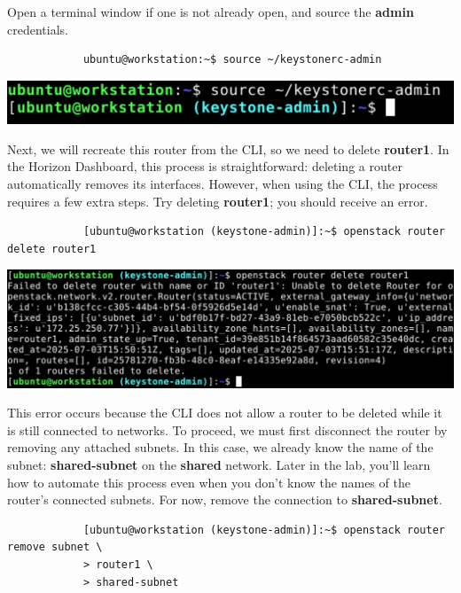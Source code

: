\documentclass[letterpaper, 12pt]{article}
\begin{document}
\begin{enumerate}
    \begin{labstep}
        Open a terminal window if one is not already open, and source the \textbf{admin} credentials.
        \begin{lstlisting}
            ubuntu@workstation:~$ source ~/keystonerc-admin
        \end{lstlisting}

        \begin{center}
            \includegraphics[width=\linewidth]{images/part2/step8.png}
        \end{center}
    \end{labstep}

    \begin{labstep}
        Next, we will recreate this router from the CLI, so we need to delete \textbf{router1}.
        In the Horizon Dashboard, this process is straightforward: deleting a router automatically removes its interfaces.
        However, when using the CLI, the process requires a few extra steps.
        Try deleting \textbf{router1}; you should receive an error.
        \begin{lstlisting}
            [ubuntu@workstation (keystone-admin)]:~$ openstack router delete router1
        \end{lstlisting}

        \begin{center}
            \includegraphics[width=\linewidth]{images/part2/step9.png}
        \end{center}
    \end{labstep}

    \begin{labstep}
        This error occurs because the CLI does not allow a router to be deleted while it is still connected to networks.
        To proceed, we must first disconnect the router by removing any attached subnets.
        In this case, we already know the name of the subnet: \textbf{shared-subnet} on the \textbf{shared} network.
        Later in the lab, you'll learn how to automate this process even when you don't know the names of the router's connected subnets.
        For now, remove the connection to \textbf{shared-subnet}.
        \begin{lstlisting}
            [ubuntu@workstation (keystone-admin)]:~$ openstack router remove subnet \
            > router1 \
            > shared-subnet
        \end{lstlisting}


\end{labstep}
\end{enumerate}
\end{document}
